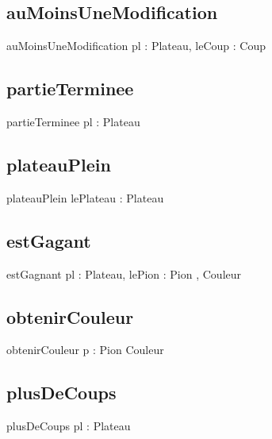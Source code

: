 	\subsection{auMoinsUneModification}
		\begin{algorithme}
			\signaturefonction
				{auMoinsUneModification}
				{pl : Plateau, leCoup : Coup}
				{\booleen}
		\end{algorithme}
	\subsection{partieTerminee}
		\begin{algorithme}
			\signaturefonction
				{partieTerminee}
				{pl : Plateau}
				{\booleen}
		\end{algorithme}
	\subsection{plateauPlein}
		\begin{algorithme}
			\signaturefonction
				{plateauPlein}
				{lePlateau : Plateau}
				{\booleen}
		\end{algorithme}
	\subsection{estGagant}
		\begin{algorithme}
			\signaturefonction
				{estGagnant}
				{pl : Plateau, lePion : Pion}
				{\booleen, Couleur}
		\end{algorithme}
	\subsection{obtenirCouleur}
		\begin{algorithme}
			\signaturefonction
				{obtenirCouleur}
				{p : Pion}
				{Couleur}
		\end{algorithme}
	\subsection{plusDeCoups}
		\begin{algorithme}
			\signaturefonction
				{plusDeCoups}
				{pl : Plateau}
				{\booleen}
		\end{algorithme}
